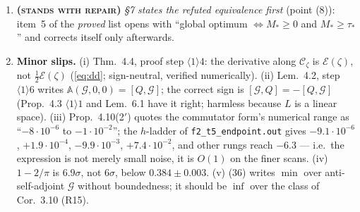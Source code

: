 \documentclass[11pt]{article}
\newcommand{\Aop}{\mathbb A}
\begin{document}
\begin{enumerate}[leftmargin=2.4em,itemsep=1pt,label=\textbf{N\arabic*.}]
 $\zeta$, which is not assumed (and Rem.~4.8(i) says $\sigma$ is invisible there).  For
 $\zeta_0$ it happens to be true; in general the correct statement is that
 $\overline{\mathcal G|_{C_c^\infty(D)}}$ is an isometry generator \emph{when} $C_c^\infty(D)$
 is a core for $\zeta$.  The inclusion (3) survives either way if the right-hand side is
 read with ``$\mathcal G$ the anti-symmetric part of an admissible $\zeta$''.
\item \textbf{(\textsc{stands with repair})} \emph{\S7 states the refuted equivalence
 first} (point (8)): item~5 of the \emph{proved} list opens with ``global optimum
 $\iff M_*\ge0$ and $M_*\ge\tau_*$'' and corrects itself only afterwards.
\item \textbf{Minor slips.}  (i) Thm.~4.4, proof step $\langle1\rangle4$: the derivative
 along $\mathcal C_\zeta$ is $\mathcal E(\zeta)$, not $\frac12\mathcal E(\zeta)$
 (\eqref{eq:dd}; sign-neutral, verified numerically).  (ii) Lem.~4.2, step
 $\langle1\rangle6$ writes $\Aop(\mathcal G,0,0)=[Q,\mathcal G]$; the correct sign is
 $[\mathcal G,Q]=-[Q,\mathcal G]$ (Prop.~4.3 $\langle1\rangle1$ and Lem.~6.1 have it right;
 harmless because $L$ is a linear space).  (iii) Prop.~4.10(2$'$) quotes the commutator
 form's numerical range as ``$-8\cdot10^{-6}$ to $-1\cdot10^{-2}$''; the
 $h$-ladder of \texttt{f2\_t5\_endpoint.out} gives $-9.1\cdot10^{-6}$, $+1.9\cdot10^{-4}$,
 $-9.9\cdot10^{-3}$, $+7.4\cdot10^{-2}$, and other rungs reach $-6.3$ --- i.e.\ the
 expression is not merely small noise, it is $O(1)$ on the finer scans.  (iv) $1-2/\pi$ is
 $6.9\sigma$, not $6\sigma$, below $0.384\pm0.003$.  (v) (36) writes $\min$ over
 anti-self-adjoint $\mathcal G$ without boundedness; it should be $\inf$ over the class of
 Cor.~3.10 (R15).
\end{enumerate}
\end{document}
